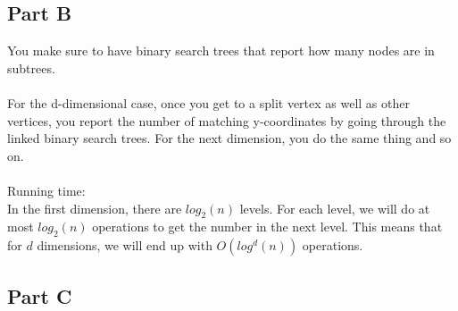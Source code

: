 \documentclass[11pt,psfig]{article}
\begin{document}
\subsection*{Part B}

You make sure to have binary search trees that report how many nodes are in subtrees. \\
\\
For the d-dimensional case, once you get to a split vertex as well as other vertices, you report the number of matching y-coordinates by going through the linked binary search trees. For the next dimension, you do the same thing and so on. \\
\\
Running time:\\
In the first dimension, there are $log_2(n)$ levels. For each level, we will do at most $log_2(n)$ operations to get the number in the next level. This means that for $d$ dimensions, we will end up with $O(log^d(n))$ operations. 
\\

\subsection*{Part C}


\end{document}
